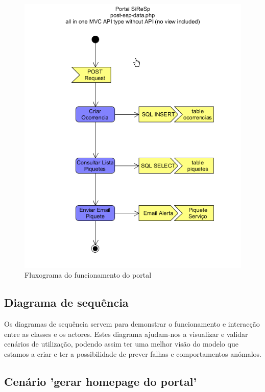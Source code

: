 \begin{figure}[!htb]
	\centering
	\includegraphics[width=\textwidth]{figuras/fluxograma_portal.png}
	\caption{Fluxograma do funcionamento do portal}
	\label{fig:fluxograma_portal}
\end{figure}

\FloatBarrier\subsection{Diagrama de sequência}

Os diagramas de sequência servem para demonstrar o funcionamento e interacção entre as classes e os actores. Estes diagrama ajudam-nos a visualizar e validar cenários de utilização, podendo assim ter uma melhor visão do modelo que estamos a criar e ter a possibilidade de prever falhas e comportamentos anómalos.

\FloatBarrier\subsection{Cenário 'gerar homepage do portal'}

